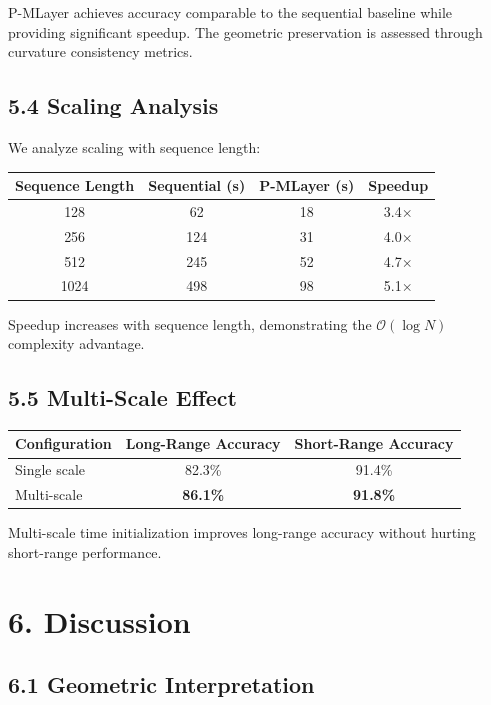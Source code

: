 \documentclass[12pt]{article}
\begin{document}
P-MLayer achieves accuracy comparable to the sequential baseline while providing significant speedup. The geometric preservation is assessed through curvature consistency metrics.

\subsection{5.4 Scaling Analysis}

We analyze scaling with sequence length:

\begin{center}
\begin{tabular}{|c|c|c|c|}
\hline
\textbf{Sequence Length} & \textbf{Sequential (s)} & \textbf{P-MLayer (s)} & \textbf{Speedup} \\
\hline
128 & 62 & 18 & 3.4$\times$ \\
256 & 124 & 31 & 4.0$\times$ \\
512 & 245 & 52 & 4.7$\times$ \\
1024 & 498 & 98 & 5.1$\times$ \\
\hline
\end{tabular}
\end{center}

Speedup increases with sequence length, demonstrating the $\mathcal{O}(\log N)$ complexity advantage.

\subsection{5.5 Multi-Scale Effect}

\begin{center}
\begin{tabular}{|l|c|c|}
\hline
\textbf{Configuration} & \textbf{Long-Range Accuracy} & \textbf{Short-Range Accuracy} \\
\hline
Single scale & 82.3\% & 91.4\% \\
Multi-scale & \textbf{86.1\%} & \textbf{91.8\%} \\
\hline
\end{tabular}
\end{center}

Multi-scale time initialization improves long-range accuracy without hurting short-range performance.

\section{6. Discussion}

\subsection{6.1 Geometric Interpretation}
\end{document}
